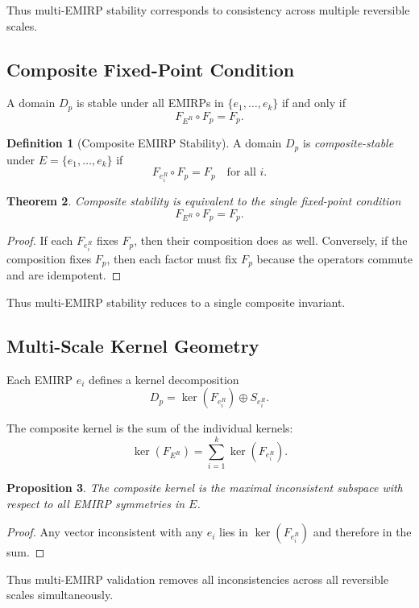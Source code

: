 \documentclass[11pt]{article}
\theoremstyle{definition}
\newtheorem{definition}{Definition}[section]
\theoremstyle{plain}
\newtheorem{theorem}[definition]{Theorem}
\newtheorem{proposition}[definition]{Proposition}
\theoremstyle{remark}
\begin{document}
Thus multi-EMIRP stability corresponds to consistency across multiple
reversible scales.

\subsection{Composite Fixed-Point Condition}

A domain $D_p$ is stable under all EMIRPs in $\{e_1,\dots,e_k\}$ if and
only if
\[
F_{E^R} \circ F_p = F_p.
\]

\begin{definition}[Composite EMIRP Stability]
A domain $D_p$ is \emph{composite-stable} under $E=\{e_1,\dots,e_k\}$ if
\[
F_{e_i^R} \circ F_p = F_p
\quad \text{for all } i.
\]
\end{definition}

\begin{theorem}
Composite stability is equivalent to the single fixed-point condition
\[
F_{E^R} \circ F_p = F_p.
\]
\end{theorem}

\begin{proof}
If each $F_{e_i^R}$ fixes $F_p$, then their composition does as well.
Conversely, if the composition fixes $F_p$, then each factor must fix
$F_p$ because the operators commute and are idempotent.
\end{proof}

Thus multi-EMIRP stability reduces to a single composite invariant.

\subsection{Multi-Scale Kernel Geometry}

Each EMIRP $e_i$ defines a kernel decomposition
\[
D_p = \ker(F_{e_i^R}) \oplus S_{e_i^R}.
\]

The composite kernel is the sum of the individual kernels:
\[
\ker(F_{E^R}) = \sum_{i=1}^k \ker(F_{e_i^R}).
\]

\begin{proposition}
The composite kernel is the maximal inconsistent subspace with respect
to all EMIRP symmetries in $E$.
\end{proposition}

\begin{proof}
Any vector inconsistent with any $e_i$ lies in $\ker(F_{e_i^R})$ and
therefore in the sum.
\end{proof}

Thus multi-EMIRP validation removes all inconsistencies across all
reversible scales simultaneously.
\end{document}
